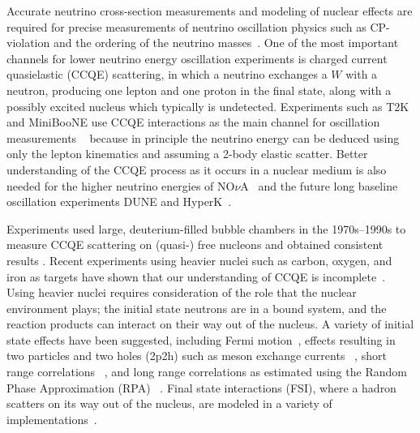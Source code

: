 
Accurate neutrino cross-section measurements and modeling of nuclear effects are required for precise measurements of neutrino oscillation physics such as CP-violation and the ordering of the neutrino masses~\cite{Abe:2011ks,Ayres:2004js,Acciarri:2015uup}. 
One of the most important channels for lower neutrino energy oscillation experiments is charged current quasielastic (CCQE) scattering, in which a neutrino exchanges a $W$ with a neutron, producing one lepton and one proton in the final state, along with a possibly excited nucleus which typically is undetected. Experiments such as T2K and MiniBooNE use CCQE interactions as the main channel for oscillation measurements ~\cite{Abe:2015ibe,Aguilar-Arevalo:2013pmq} because in principle the neutrino energy can be deduced using only the lepton kinematics and assuming a 2-body elastic scatter. Better understanding of the CCQE process as it occurs in a nuclear medium is also needed for the higher neutrino energies of NO$\nu$A~\cite{Adamson:2016tbq} and the future long baseline oscillation experiments DUNE and HyperK~\cite{Acciarri:2015uup,Ayres:2004js}.

Experiments used large, deuterium-filled bubble chambers in the 1970s--1990s to measure CCQE scattering on (quasi-) free nucleons and obtained consistent results \cite{Baker:1981su,Miller:1982qi,PhysRevD.28.436}. Recent experiments using heavier nuclei such as carbon, oxygen, and iron as targets have shown that our understanding of CCQE is incomplete~\cite{Gran:2006jn,AguilarArevalo:2008rc,AguilarArevalo:2010wv,PhysRevLett.111.022502,Fields:2013zhk,PhysRevD.91.012005}. Using heavier nuclei requires consideration of the role that the nuclear environment plays; the initial state neutrons are in a bound system, and the reaction products can interact on their way out of the nucleus.  A variety of initial state effects have been suggested, including Fermi motion~\cite{Smith:1972xh}, effects resulting in two particles and two holes (2p2h) such as meson exchange currents ~\cite{Martini:2009uj,Nieves:2013fr,PhysRevC.83.045501}, short range correlations ~\cite{Benhar:2006wy,Arrington:2011xs,Arrington:2012ax}, and long range correlations as estimated using the Random Phase Approximation (RPA) ~\cite{Graczyk:2003ru,Nieves:2004wx,Valverde:2006yi}. Final state interactions (FSI), where a hadron scatters on its way out of the nucleus, are modeled in a variety of implementations~\cite{Andreopoulos:2009rq,Nowak:2006xv,Golan:2013jtj}.

